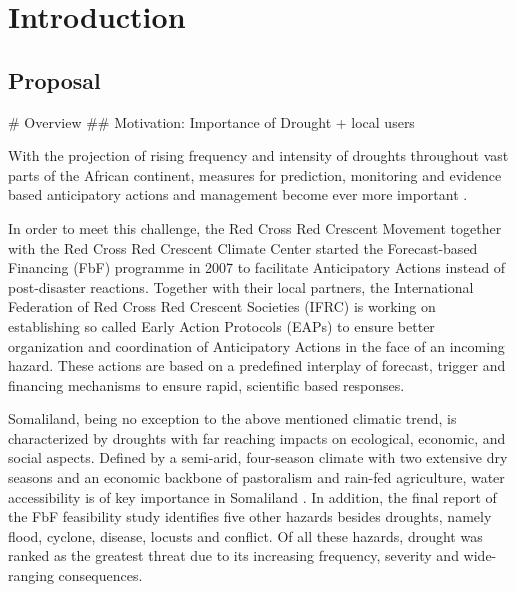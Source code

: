 
\chapter{Introduction} %

\label{Chapter1} %



\section{Proposal}
\# Overview
\#\# Motivation: Importance of Drought + local users

With the projection of rising frequency and intensity of droughts throughout vast parts of the African continent, measures for prediction, monitoring and evidence based anticipatory actions and management become ever more important \autocite{abdulkadirAssessmentDroughtRecurrence2017,adelekanAfricaClimateChange2022,vereintenationenSpecialReportDrought2021}.

In order to meet this challenge, the Red Cross Red Crescent Movement together with the Red Cross Red Crescent Climate Center started the Forecast-based Financing (FbF) programme in 2007 to facilitate Anticipatory Actions instead of post-disaster reactions. Together with their local partners, the International Federation of Red Cross Red Crescent Societies (IFRC) is working on establishing so called Early Action Protocols (EAPs) to ensure better organization and coordination of Anticipatory Actions in the face of an incoming hazard. These actions are based on a predefined interplay of forecast, trigger and financing mechanisms to ensure rapid, scientific based responses.

Somaliland, being no exception to the above mentioned climatic trend, is characterized by droughts with far reaching impacts on ecological, economic, and social aspects. Defined by a semi-arid, four-season climate with two extensive dry seasons and an economic backbone of pastoralism and rain-fed agriculture, water accessibility is of key importance in Somaliland \autocite{abdulkadirAssessmentDroughtRecurrence2017,petrucciLandscapeLandformsNorthern2022,republicofsomalilandSomalilandCountryProfile2021}.
In addition, the final report of the FbF feasibility study identifies five other hazards besides droughts, namely flood, cyclone, disease, locusts and conflict. Of all these hazards, drought was ranked as the greatest threat due to its increasing frequency, severity and wide-ranging consequences.\newline

